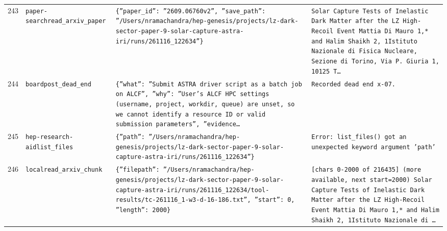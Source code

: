\documentclass[11pt,a4paper]{article}
\begin{document}
\begin{longtable}{@{}p{}p{}p{}p{}@{}}
243 & \texttt{paper-search}\newline\texttt{read\_\allowbreak{}arxiv\_\allowbreak{}paper} & \texttt{\{''paper\_\allowbreak{}id'':\allowbreak{} ''2609.06760v2'',\allowbreak{} ''save\_\allowbreak{}path'':\allowbreak{} ''/\allowbreak{}Users/\allowbreak{}nramachandra/\allowbreak{}hep-genesis/\allowbreak{}projects/\allowbreak{}lz-dark-sector-paper-9-solar-capture-astra-iri/\allowbreak{}runs/\allowbreak{}261116\_\allowbreak{}122634''\}\allowbreak{}} & \texttt{Solar Capture Tests of Inelastic Dark Matter after the LZ High-Recoil Event Mattia Di Mauro 1,\allowbreak{}* and Halim Shaikh 2,\allowbreak{}\dag{}\allowbreak{} 1Istituto Nazionale di Fisica Nucleare,\allowbreak{} Sezione di Torino,\allowbreak{} Via P. Giuria 1,\allowbreak{} 10125 T\ldots{}\allowbreak{}} \\
244 & \texttt{board}\newline\texttt{post\_\allowbreak{}dead\_\allowbreak{}end} & \texttt{\{''what'':\allowbreak{} ''Submit ASTRA driver script as a batch job on ALCF'',\allowbreak{} ''why'':\allowbreak{} ''User's ALCF HPC settings (username,\allowbreak{} project,\allowbreak{} workdir,\allowbreak{} queue)\allowbreak{} are unset,\allowbreak{} so we cannot identify a resource ID or valid submission parameters'',\allowbreak{} ''evidence\ldots{}\allowbreak{}} & \texttt{Recorded dead end x-07.} \\
245 & \texttt{hep-research-aid}\newline\texttt{list\_\allowbreak{}files} & \texttt{\{''path'':\allowbreak{} ''/\allowbreak{}Users/\allowbreak{}nramachandra/\allowbreak{}hep-genesis/\allowbreak{}projects/\allowbreak{}lz-dark-sector-paper-9-solar-capture-astra-iri/\allowbreak{}runs/\allowbreak{}261116\_\allowbreak{}122634''\}\allowbreak{}} & \texttt{Error:\allowbreak{} list\_\allowbreak{}files()\allowbreak{} got an unexpected keyword argument 'path'} \\
246 & \texttt{local}\newline\texttt{read\_\allowbreak{}arxiv\_\allowbreak{}chunk} & \texttt{\{''filepath'':\allowbreak{} ''/\allowbreak{}Users/\allowbreak{}nramachandra/\allowbreak{}hep-genesis/\allowbreak{}projects/\allowbreak{}lz-dark-sector-paper-9-solar-capture-astra-iri/\allowbreak{}runs/\allowbreak{}261116\_\allowbreak{}122634/\allowbreak{}tool-results/\allowbreak{}tc-261116\_\allowbreak{}1-w3-d-16-186.txt'',\allowbreak{} ''start'':\allowbreak{} 0,\allowbreak{} ''length'':\allowbreak{} 2000\}\allowbreak{}} & \texttt{[chars 0-2000 of 216435]\allowbreak{} (more available,\allowbreak{} next start=\allowbreak{}2000)\allowbreak{}  Solar Capture Tests of Inelastic Dark Matter after the LZ High-Recoil Event Mattia Di Mauro 1,\allowbreak{}* and Halim Shaikh 2,\allowbreak{}\dag{}\allowbreak{} 1Istituto Nazionale di \ldots{}\allowbreak{}} \\

\end{longtable}
\end{document}
